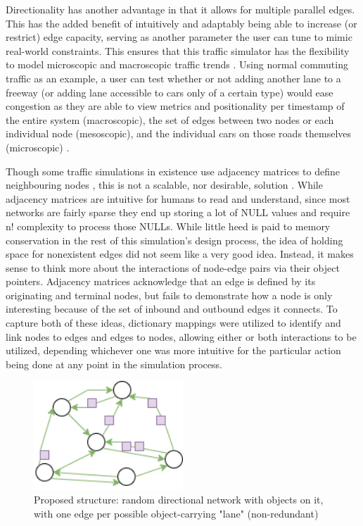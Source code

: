 \par Directionality has another advantage in that it allows for multiple parallel edges.  This has the added benefit of intuitively and adaptably being able  to increase (or restrict) edge capacity, serving as another parameter the user can tune to mimic real-world constraints.  This ensures that this traffic simulator has the flexibility to model microscopic and macroscopic traffic trends \cite{LWB18}.  Using normal commuting traffic as an example, a user can test whether or not adding another lane to a freeway (or adding lane accessible to cars only of a certain type) would ease congestion as they are able to view metrics and positionality per timestamp of the entire system (macroscopic), the set of edges between two nodes or each individual node (mesoscopic), and the individual cars on those roads themselves (microscopic) \cite{LWB18}. \\


\par Though some traffic simulations in existence use adjacency matrices to define neighbouring nodes \cite{GPK02}, this is not a scalable, nor desirable, solution .  While adjacency matrices are intuitive for humans to read and understand, since most networks are fairly sparse they end up storing a lot of NULL values and require n! complexity to process those NULLs.  While little heed is paid to memory conservation in the rest of this simulation's design process, the idea of holding space for nonexistent edges did not seem like a very good idea.  Instead, it makes sense to think more about the interactions of node-edge pairs via their object pointers.  Adjacency matrices acknowledge that an edge is defined by its originating and terminal nodes, but fails to demonstrate how a node is only interesting because of the set of inbound and outbound edges it connects.  To capture both of these ideas, dictionary mappings were utilized to identify and link nodes to edges and edges to nodes, allowing either or both interactions to be utilized, depending whichever one was more intuitive for the particular action being done at any point in the simulation process.\\

\begin{figure}[H]
    \centering
	\includegraphics[width=0.5\textwidth]{tex files/Figures/generic_network.png}
	\caption[Random directional network]{Proposed structure:  random directional network with objects on it, with one edge per possible object-carrying "lane" (non-redundant)}
	\label{fig:generic_network}
\end{figure}

